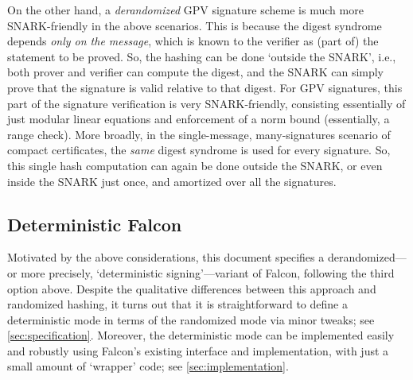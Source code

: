 \documentclass[11pt]{article}
\begin{document}
On the other hand, a \emph{derandomized} GPV signature scheme is much
more SNARK-friendly in the above scenarios. This is because the digest
syndrome depends \emph{only on the message}, which is known to the
verifier as (part of) the statement to be proved. So, the hashing can
be done `outside the SNARK', i.e., both prover and verifier can
compute the digest, and the SNARK can simply prove that the signature
is valid relative to that digest. For GPV signatures, this part of the
signature verification is very SNARK-friendly, consisting essentially
of just modular linear equations and enforcement of a norm bound
(essentially, a range check). More broadly, in the single-message,
many-signatures scenario of compact certificates, the \emph{same}
digest syndrome is used for every signature. So, this single hash
computation can again be done outside the SNARK, or even inside the
SNARK just once, and amortized over all the signatures.

\subsection{Deterministic Falcon}
\label{sec:deterministic-falcon}

Motivated by the above considerations, this document specifies a
derandomized---or more precisely, `deterministic signing'---variant of
Falcon, following the third option above. Despite the qualitative
differences between this approach and randomized hashing, it turns out
that it is straightforward to define a deterministic mode in terms of
the randomized mode via minor tweaks; see \cref{sec:specification}.
Moreover, the deterministic mode can be implemented easily and
robustly using Falcon's existing interface and implementation, with
just a small amount of `wrapper' code; see \cref{sec:implementation}.




\newcommand{\sfname}[1]{\ensuremath{\mathsf{#1}}\xspace}

\newcommand{\unsaltedsig}{\sfname{unsalted\textunderscore sig}}
\newcommand{\saltedsig}{\sfname{salted\textunderscore sig}}
\newcommand{\saltversionbyte}{\sfname{salt\textunderscore version\textunderscore byte}}
\newcommand{\saltedheaderbyte}{\sfname{salted\textunderscore header\textunderscore byte}}
\newcommand{\unsaltedheaderbyte}{\sfname{unsalted\textunderscore header\textunderscore byte}}
\newcommand{\rbytes}{\sfname{r\textunderscore bytes}}
\newcommand{\sbytes}{\sfname{s\textunderscore bytes}}
\newcommand{\preversionedsalt}{\sfname{preversioned\textunderscore salt}}
\end{document}
